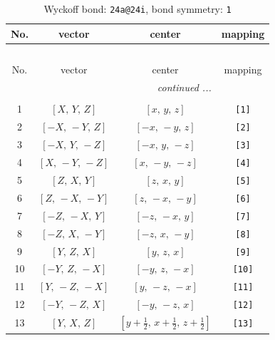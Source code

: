 \documentclass[fleqn,8pt]{jsarticle}
\begin{document}
\begin{longtable}{cccc}
\caption{Wyckoff bond: {\tt 24a@24i}, bond symmetry: {\tt 1}}
 \\
 \hline \hline
No. & vector & center & mapping \\ \hline \endfirsthead

\multicolumn{3}{l}{\tablename\ \thetable{}} \\
 \hline \hline
No. & vector & center & mapping \\ \hline \endhead

 \hline \hline
\multicolumn{3}{r}{\footnotesize\it continued ...} \\ \endfoot

 \hline \hline
\multicolumn{3}{r}{} \\ \endlastfoot

1 & $\left[ X,\, Y,\, Z \right]$ & $\left[ x,\, y,\, z \right]$ & {\tt [1]} \\ \hline
2 & $\left[ - X,\, - Y,\, Z \right]$ & $\left[ - x,\, - y,\, z \right]$ & {\tt [2]} \\ \hline
3 & $\left[ - X,\, Y,\, - Z \right]$ & $\left[ - x,\, y,\, - z \right]$ & {\tt [3]} \\ \hline
4 & $\left[ X,\, - Y,\, - Z \right]$ & $\left[ x,\, - y,\, - z \right]$ & {\tt [4]} \\ \hline
5 & $\left[ Z,\, X,\, Y \right]$ & $\left[ z,\, x,\, y \right]$ & {\tt [5]} \\ \hline
6 & $\left[ Z,\, - X,\, - Y \right]$ & $\left[ z,\, - x,\, - y \right]$ & {\tt [6]} \\ \hline
7 & $\left[ - Z,\, - X,\, Y \right]$ & $\left[ - z,\, - x,\, y \right]$ & {\tt [7]} \\ \hline
8 & $\left[ - Z,\, X,\, - Y \right]$ & $\left[ - z,\, x,\, - y \right]$ & {\tt [8]} \\ \hline
9 & $\left[ Y,\, Z,\, X \right]$ & $\left[ y,\, z,\, x \right]$ & {\tt [9]} \\ \hline
10 & $\left[ - Y,\, Z,\, - X \right]$ & $\left[ - y,\, z,\, - x \right]$ & {\tt [10]} \\ \hline
11 & $\left[ Y,\, - Z,\, - X \right]$ & $\left[ y,\, - z,\, - x \right]$ & {\tt [11]} \\ \hline
12 & $\left[ - Y,\, - Z,\, X \right]$ & $\left[ - y,\, - z,\, x \right]$ & {\tt [12]} \\ \hline
13 & $\left[ Y,\, X,\, Z \right]$ & $\left[ y + \frac{1}{2},\, x + \frac{1}{2},\, z + \frac{1}{2} \right]$ & {\tt [13]} \\ \hline

\end{longtable}
\end{document}
